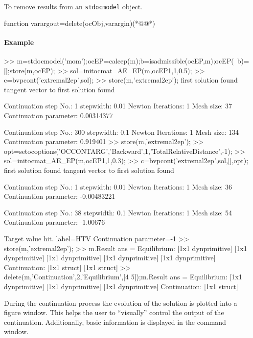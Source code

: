 To remove results from an \lstinline+stdocmodel+ object.
\begin{matlab}
function varargout=delete(ocObj,varargin)(*@@*)
%
%
%
%
\end{matlab}
\paragraph{Example}
\begin{matlab}
>> m=stdocmodel('mom');ocEP=calcep(m);b=isadmissible(ocEP,m);ocEP(~b)=[];store(m,ocEP);
>> sol=initocmat_AE_EP(m,ocEP{1},1,0.5);
>> c=bvpcont('extremal2ep',sol);
>> store(m,'extremal2ep');
first solution found
tangent vector to first solution found

 Continuation step No.: 1
 stepwidth: 0.01
 Newton Iterations: 1
 Mesh size: 37
 Continuation parameter: 0.00314377

 Continuation step No.: 300
 stepwidth: 0.1
 Newton Iterations: 1
 Mesh size: 134
 Continuation parameter: 0.919401
>> store(m,'extremal2ep');
>> opt=setocoptions('OCCONTARG','Backward',1,'TotalRelativeDistance',-1);
>> sol=initocmat_AE_EP(m,ocEP{1},1,0.3);
>> c=bvpcont('extremal2ep',sol,[],opt);
first solution found
tangent vector to first solution found

 Continuation step No.: 1
 stepwidth: 0.01
 Newton Iterations: 1
 Mesh size: 36
 Continuation parameter: -0.00483221


 Continuation step No.: 38
 stepwidth: 0.1
 Newton Iterations: 1
 Mesh size: 54
 Continuation parameter: -1.00676

 Target value hit.
 label=HTV
 Continuation parameter=-1
>> store(m,'extremal2ep');
>> m.Result
ans = 
     Equilibrium: {[1x1 dynprimitive]  [1x1 dynprimitive]  [1x1 dynprimitive]  [1x1 dynprimitive]  [1x1 dynprimitive]}
    Continuation: {[1x1 struct]  [1x1 struct]}
>> delete(m,'Continuation',2,'Equilibrium',[4 5]);m.Result
ans = 
     Equilibrium: {[1x1 dynprimitive]  [1x1 dynprimitive]  [1x1 dynprimitive]}
    Continuation: {[1x1 struct]}
\end{matlab}
During the continuation process the evolution of the solution is plotted into a figure window. This helps the user to ``visually'' control the output of the continuation. Additionally, basic information is displayed in the command window.
